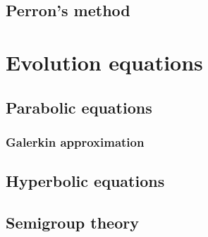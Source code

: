 \documentclass{../note}
\begin{document}
\chapter{Perron's method}











\part{Evolution equations}

\chapter{Parabolic equations}
\section{Galerkin approximation}
\chapter{Hyperbolic equations}

\chapter{Semigroup theory}
\end{document}
